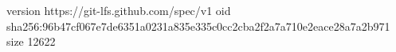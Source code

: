 version https://git-lfs.github.com/spec/v1
oid sha256:96b47cf067e7de6351a0231a835e335c0cc2cba2f2a7a710e2eace28a7a2b971
size 12622
